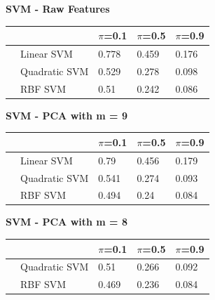 \documentclass[english]{report}
\begin{document}
\textbf{SVM - Raw Features}

\begin{table}[H]
    \centering
    \begin{tabular}{lllll}
        \hline
                                & & $\pi$=0.1 & $\pi$=0.5 & $\pi$=0.9 \\\hline
                                
                                & Linear SVM        & 0.778 & 0.459 & 0.176 \\
                                & Quadratic SVM     & 0.529 & 0.278 & 0.098 \\
                                & RBF SVM           & 0.51  & 0.242 & 0.086\\ 
        \hline
    \end{tabular}
    \label{tab:SVM_Raw_eval}
\end{table}

\textbf{SVM - PCA with m = 9}

\begin{table}[H]
    \centering
    \begin{tabular}{lllll}
        \hline
                                & & $\pi$=0.1 & $\pi$=0.5 & $\pi$=0.9 \\\hline
                                                        
                                & Linear SVM        & 0.79  & 0.456 & 0.179 \\
                                & Quadratic SVM     & 0.541 & 0.274 & 0.093 \\
                                & RBF SVM           & 0.494 & 0.24  & 0.084\\  
        \hline
    \end{tabular}
    \label{tab:SVM_PCA9_eval}
\end{table}

\textbf{SVM - PCA with m = 8}

\begin{table}[H]
    \centering
    \begin{tabular}{lllll}
        \hline
                                & & $\pi$=0.1 & $\pi$=0.5 & $\pi$=0.9 \\\hline
                                                        
                                & Quadratic SVM     & 0.51 & 0.266 & 0.092 \\
                                & RBF SVM           & 0.469  & 0.236 & 0.084\\    
        \hline
    \end{tabular}
    \label{tab:SVM_PCA8_eval}
\end{table}
\end{document}
